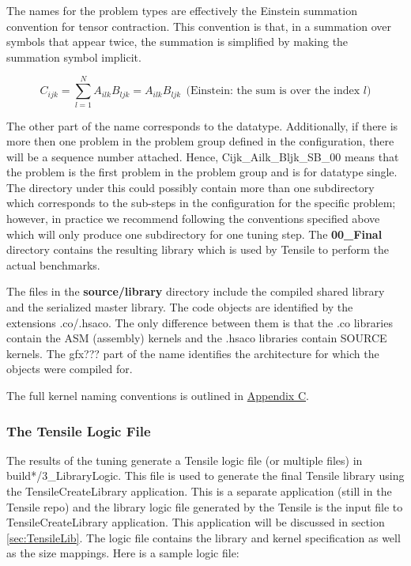 \documentclass[]{article}
\begin{document}
\noindent
The names for the problem types are effectively the Einstein summation convention for tensor contraction. This convention is that, in a summation over symbols that appear twice, the summation is simplified by making the summation symbol implicit.

\[ C_{ijk} = \sum_{l=1}^{N} A_{ilk} B_{ljk} = A_{ilk} B_{ljk}\ \ \text{(Einstein: the sum is over the index $l$)}\]

The other part of the name corresponds to the datatype. Additionally, if there is more then one problem in the problem group defined in the configuration, there will be a sequence number attached. Hence, Cijk\_Ailk\_Bljk\_SB\_00 means that the problem is the first problem in the problem group and is for datatype single. The directory under this could possibly contain more than one subdirectory which corresponds to the sub-steps in the configuration for the specific problem; however, in practice we recommend following the conventions specified above which will only produce one subdirectory for one tuning step. The \textbf{00\_Final} directory contains the resulting library which is used by Tensile to perform the actual benchmarks.

The files in the \textbf{source/library} directory include the compiled shared library and the serialized master library. The code objects are identified by the extensions .co/.hsaco. The only difference between them is that the .co libraries contain the ASM (assembly) kernels and the .hsaco libraries contain SOURCE kernels. The gfx??? part of the name identifies the architecture for which the objects were compiled for.

The full kernel naming conventions is outlined in \hyperref[sec:appendixC]{Appendix C}.


\subsubsection{The Tensile Logic File}
\label{sec:logicFile}

\noindent
The results of the tuning generate a Tensile logic file (or multiple files) in build*/3\_LibraryLogic. This file is used to generate the final Tensile library using the TensileCreateLibrary application. This is a separate application (still in the Tensile repo) and the library logic file generated by the Tensile is the input file to TensileCreateLibrary application. This application will be discussed in section \ref{sec:TensileLib}. The logic file contains the library and kernel specification as well as the size mappings. Here is a sample logic file:
\end{document}
